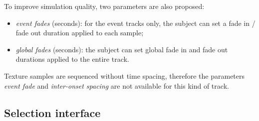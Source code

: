 \documentclass[12pt]{elsarticle}
\providecommand{\DIFaddbegin}{} %
\providecommand{\DIFaddend}{} %
\begin{document}

To improve simulation quality, two parameters are also proposed:


 \begin{itemize} 
\item \emph{event fades} (seconds): for the event tracks only, the subject can set a fade in / fade out duration applied to each sample;
\item \emph{global fades} (seconds): the subject can set global fade in and fade out durations applied to the entire track.
 \end{itemize} 


Texture samples are sequenced without time spacing, therefore the parameters \emph{event fade} and \emph{inter-onset spacing} are not available for this kind of track.

\DIFaddbegin 

\DIFaddend \subsection{Selection interface}
\label{sec:simscene_ssf}
\end{document}
